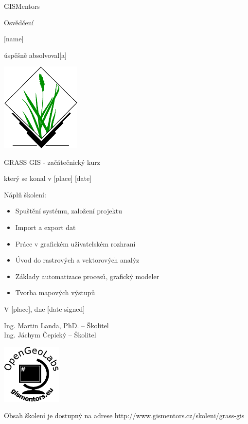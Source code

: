 \documentclass[12pt, a4paper]{letter}
\begin{document}
\pagestyle{empty}
\begin{center}

{\Large GISMentors}

{\Huge Osvědčení}

{\Large [name]}

úspěšně absolvoval[a]

\includegraphics[width=0.30\textwidth]{../images/grasslogo_vector.eps}

{\Large GRASS GIS - začátečnický kurz}

který se konal v [place] [date]
\end{center}

Náplň školení:

\begin{itemize}
    \item Spuštění systému, založení projektu
    \item Import a export dat
    \item Práce v grafickém uživatelském rozhraní
    \item Úvod do rastrových a vektorových analýz
    \item Základy automatizace procesů, grafický modeler
    \item Tvorba mapových výstupů
\end{itemize}

\vfill
\parbox{7cm}{

    V [place], dne [date-signed]\\

\vfill

    Ing. Martin Landa, PhD. -- Školitel\\

\vfill
    Ing. Jáchym Čepický -- Školitel
}
\hfill
\parbox{3cm}{
    \includegraphics[width=3cm]{../images/placka.eps}
}

\vfill

\begin{center}
{\footnotesize Obsah školení je dostupný na adrese
http://www.gismentors.cz/skoleni/grass-gis}
\end{center}
\end{document}

